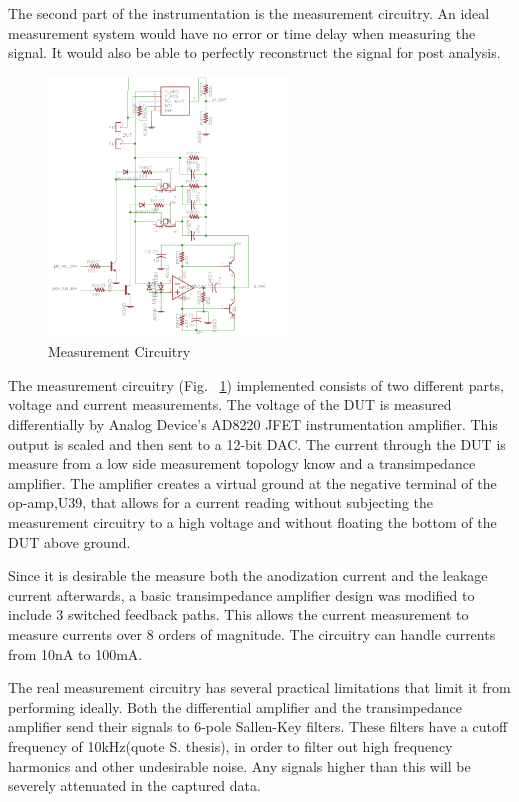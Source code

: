 \documentclass[journal]{IEEEtran}
\begin{document}
The second part of the instrumentation is the measurement circuitry. An ideal measurement system would have no error or time delay when measuring the signal. It would also be able to perfectly reconstruct the signal for post analysis. 
 

\begin{figure}[here]
\centering
\includegraphics[width=2.5in]{measCir}
\caption{Measurement Circuitry}
\label{fig:measCir}
\end{figure}

The measurement circuitry (Fig. ~\ref{fig:measCir}) implemented consists of two different parts, voltage and current measurements. The voltage of the DUT is measured differentially by Analog Device’s AD8220 JFET instrumentation amplifier. This output is scaled and then sent to a 12-bit DAC. The current through the DUT is measure from a low side measurement topology know and a transimpedance amplifier. The amplifier creates a virtual ground at the negative terminal of the op-amp,U39, that allows for a current reading without subjecting the measurement circuitry to a high voltage and without floating the bottom of the DUT above ground.

Since it is desirable the measure both the anodization current and the leakage current afterwards, a basic transimpedance amplifier design was modified to include 3 switched feedback paths. This allows the current measurement to measure currents over 8 orders of magnitude. The circuitry can handle currents from 10nA to 100mA.

The real measurement circuitry has several practical limitations that limit it from performing ideally. Both the differential amplifier and the transimpedance amplifier send their signals to 6-pole Sallen-Key filters. These filters have a cutoff frequency of 10kHz(quote S. thesis), in order to filter out high frequency harmonics and other undesirable noise. Any signals higher than this will be severely attenuated in the captured data.
\end{document}
